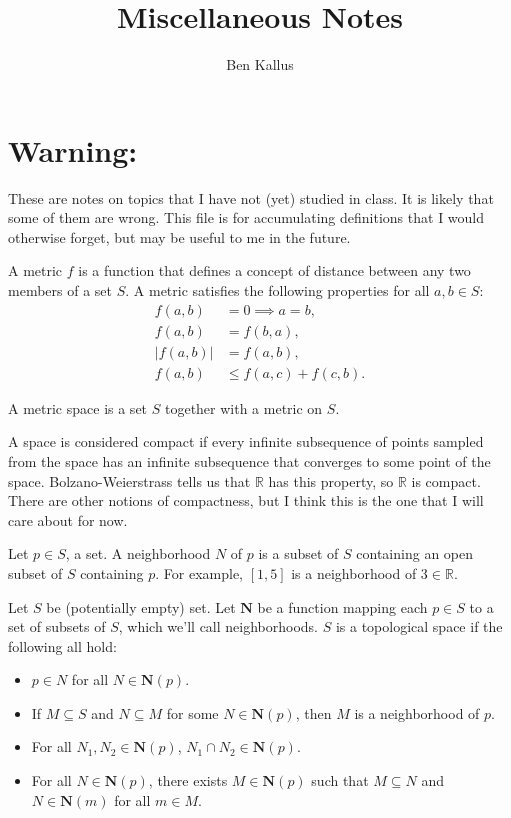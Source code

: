 \documentclass[12pt]{article}
\title{Miscellaneous Notes}
\author{Ben Kallus}
\begin{document}
\pagecolor{black}
\color{white}
\maketitle

\section*{Warning:} These are notes on topics that I have not (yet) studied in class. It is likely that some of them are wrong. This file is for accumulating definitions that I would otherwise forget, but may be useful to me in the future.

\bigskip
{}

    A metric $f$ is a function that defines a concept of distance between any two members of a set $S$. A metric satisfies the following properties for all $a, b \in S$:
    \begin{align*}
        f(a, b) &= 0 \implies a = b, \\
        f(a, b) &= f(b, a), \\
        |f(a, b)| &= f(a, b), \\
        f(a, b) &\leq f(a, c) + f(c, b).
    \end{align*}

\medskip
{}

    A metric space is a set $S$ together with a metric on $S$.

\medskip
{}

    A space is considered compact if every infinite subsequence of points sampled from the space has an infinite subsequence that converges to some point of the space. Bolzano-Weierstrass tells us that $\mathbb R$ has this property, so $\mathbb R$ is compact. There are other notions of compactness, but I think this is the one that I will care about for now.

\medskip
{}

    Let $p \in S$, a set. A neighborhood $N$ of $p$ is a subset of $S$ containing an open subset of $S$ containing $p$. For example, $[1,5]$ is a neighborhood of $3 \in \mathbb R$.

\newpage
{}

    Let $S$ be (potentially empty) set. Let $\mathbf N$ be a function mapping each $p \in S$ to a set of subsets of $S$, which we'll call neighborhoods. $S$ is a topological space if the following all hold:
    \begin{itemize}
        \item $p \in N$ for all $N \in \mathbf N(p)$.
        \item If $M \subseteq S$ and $N \subseteq M$ for some $N \in \mathbf N(p)$, then $M$ is a neighborhood of $p$.
        \item For all $N_1, N_2 \in \mathbf N(p)$, $N_1 \cap N_2 \in \mathbf N(p)$.
        \item For all $N \in \mathbf N(p)$, there exists $M \in \mathbf N(p)$ such that $M \subseteq N$ and $N \in \mathbf N(m)$ for all $m \in M$.
    \end{itemize}
\end{document}
